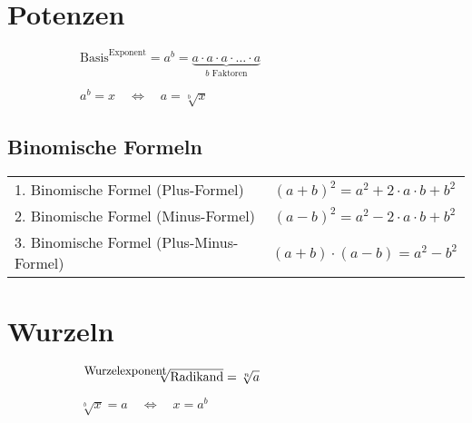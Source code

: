 \documentclass[11pt,a4paper,oneside]{article}
\newcommand{\sidebysideB}[2]{
\begin{figure}[H]
\begin{subfigure}[t]{0.5\linewidth}
#1
\end{subfigure}%
\begin{subfigure}[t]{0.5\linewidth}
#2
\end{subfigure}
\end{figure}
}
\begin{document}
\section{Potenzen}
\sidebysideB{
$\text{Basis}^{\text{Exponent}}=a^{b}=\underbrace{a\cdot a\cdot a\cdot\ldots\cdot a}_{b\text{ Faktoren}}$}{$a^{b}=x\quad\Leftrightarrow\quad a=\sqrt[b]{x}$}

\subsection{Binomische Formeln}
\vspace{-1em}
\begin{table}[H]
\begin{tabular}{@{}lc}
\rule{0pt}{1.5em}1. Binomische Formel (Plus-Formel) & $\left(a+b\right)^{2}=a^{2}+2\cdot a\cdot b+b^{2}$\\
\rule{0pt}{1.5em}2. Binomische Formel (Minus-Formel) & $\left(a-b\right)^{2}=a^{2}-2\cdot a\cdot b+b^{2}$\\
\rule{0pt}{1.5em}3. Binomische Formel (Plus-Minus-Formel) & $\left(a+b\right)\cdot\left(a-b\right)=a^{2}-b^{2}$\\
\end{tabular}
\end{table}

\section{Wurzeln}
\sidebysideB{\hspace{-2pt}$\sqrt[\text{\begin{small}Wurzelexponent\end{small}}]{\text{Radikand}}=\sqrt[n]{a}$}{$\sqrt[b]{x}=a\quad\Leftrightarrow\quad x=a^{b}$}










\vspace{-1em}
\end{document}
